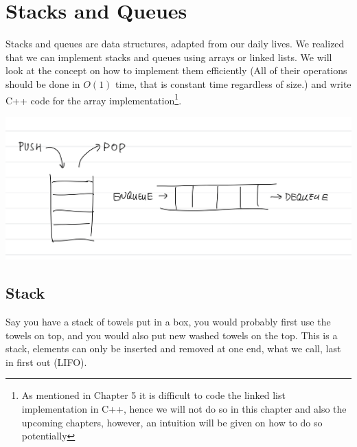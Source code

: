 \chapter{Stacks and Queues}

Stacks and queues are data structures, adapted from our daily lives. We realized that we can implement stacks and queues using arrays or linked lists. We will look at the concept on how to implement them efficiently (All of their operations should be done in $O(1)$ time, that is constant time regardless of size.) and write C++ code for the array implementation\footnote{As mentioned in Chapter 5 it is difficult to code the linked list implementation in C++, hence we will not do so in this chapter and also the upcoming chapters, however, an intuition will be given on how to do so potentially}.

\includegraphics[width=15cm]{images/ch6-stackqueue.png}

\section{Stack}
Say you have a stack of towels put in a box, you would probably first use the towels on top, and you would also put new washed towels on the top. This is a stack, elements can only be inserted and removed at one end, what we call, last in first out (LIFO).

